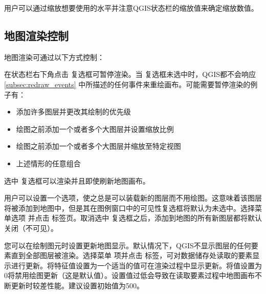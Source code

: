 用户可以通过缩放想要使用的水平并注意QGIS状态栏的缩放值来确定缩放数值。 

\subsection{地图渲染控制}\label{label_controlmap}

地图渲染可通过以下方式控制：

\label{label_suspendrender}

在状态栏右下角点击  复选框可暂停渲染。当  复选框未选中时，QGIS都不会响应 \ref{subsec:redraw_events} 中所描述的任何事件来重绘画布。可能需要暂停渲染的例子有：

\begin{itemize}

\item 添加许多图层并更改其绘制的优先级
\item 绘图之前添加一个或者多个大图层并设置缩放比例
\item 绘图之前添加一个或者多个大图层并缩放至特定视图
\item 上述情形的任意组合
\end{itemize}

选中  复选框可以渲染并且即使刷新地图画布。

\label{label_settinglayer}

用户可以设置一个选项，使之总是可以装载新的图层而不用绘图。这意味着该图层将被添加到地图中，但是其在图例窗口中的可见性复选框将默认为未选中。选择菜单选项   \arrow {} 并点击  标签页。取消选中  复选框之后，添加到地图的所有新图层都将默认关闭（不可见）。

%
%

\label{label_updatemap}

您可以在绘制图元时设置更新地图显示。默认情况下，QGIS不显示图层的任何要素直到全部图层被渲染。选择菜单  \arrow {} 项并点击  标签，可对数据储存处读取的要素显示进行更新。将特征值设置为一个适当的值可在渲染过程中显示更新。将值设置为0将禁用绘图更新（这是默认值）。设置值过低会导致在读取要素过程中地图画布不断更新时较差性能。建议设置初始值为500。

